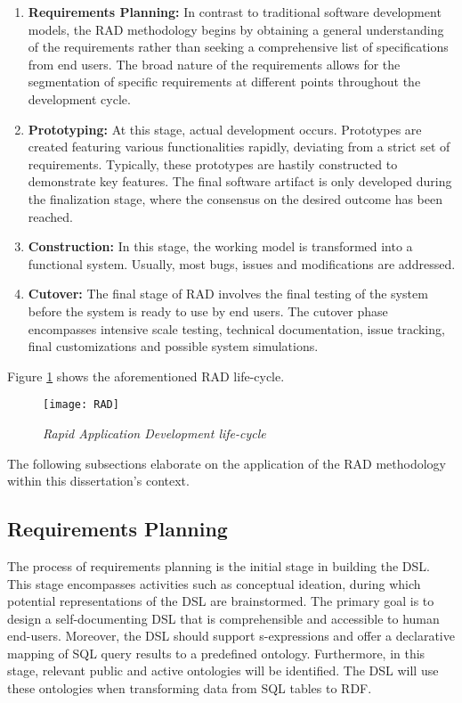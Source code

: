 \begin{enumerate}
\item \textbf{Requirements Planning:} In contrast to traditional software development models, the RAD methodology begins by obtaining a general understanding of the requirements rather than seeking a comprehensive list of specifications from end users.  The broad nature of the requirements allows for the segmentation of specific requirements at different points throughout the development cycle.

\item \textbf{Prototyping:} At this stage, actual development occurs.  Prototypes are created featuring various functionalities rapidly, deviating from a strict set of requirements.  Typically, these prototypes are hastily constructed to demonstrate key features.  The final software artifact is only developed during the finalization stage, where the consensus on the desired outcome has been reached.

\item \textbf{Construction:}  In this stage, the working model is transformed into a functional system.  Usually, most bugs, issues and modifications are addressed.

\item \textbf{Cutover:} The final stage of RAD involves the final testing of the system before the system is ready to use by end users.  The cutover phase encompasses intensive scale testing, technical documentation, issue tracking, final customizations and possible system simulations.
\end{enumerate}

Figure \ref{fig:rad-lifecycle} shows the aforementioned RAD life-cycle.

\begin{figure}[H]
  \centering
  \texttt{[image: RAD]}
  \caption{\textit{Rapid Application Development life-cycle}}
  \label{fig:rad-lifecycle}
  \centering
\end{figure}

The following subsections elaborate on the application of the RAD methodology within this dissertation's context.

\subsection{Requirements Planning}

The process of requirements planning is the initial stage in building the DSL.  This stage encompasses activities such as conceptual ideation, during which potential representations of the DSL are brainstormed.  The primary goal is to design a self-documenting DSL that is comprehensible and accessible to human end-users.  Moreover, the DSL should support s-expressions and offer a declarative mapping of SQL query results to a predefined ontology.  Furthermore, in this stage, relevant public and active ontologies will be identified.  The DSL will use these ontologies when transforming data from SQL tables to RDF.

